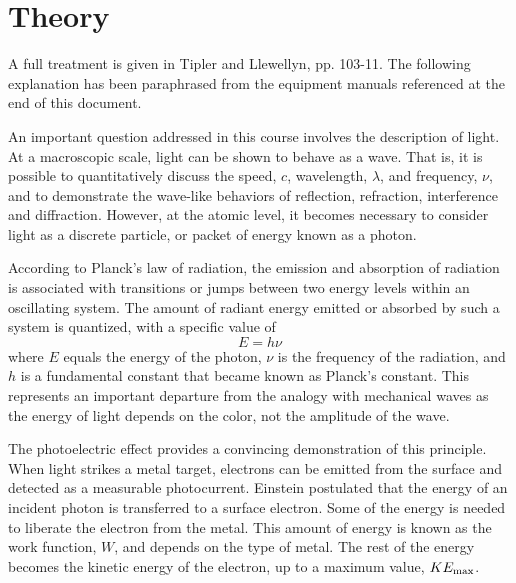 \section{Theory}


A full treatment is given in Tipler and Llewellyn, pp. 103-11.  The following explanation has been paraphrased from the equipment manuals referenced at the end of this document.

An important question addressed in this course involves the description of light.   At a macroscopic scale, light can be shown to behave as a wave.  That is, it is possible to quantitatively discuss the speed, $c$, wavelength, $\lambda$, and frequency, $\nu$, and to demonstrate the wave-like behaviors of reflection, refraction, interference and diffraction.  However, at the atomic level, it becomes necessary to consider light as a discrete particle, or packet of energy known as a photon.    

According to Planck's law of radiation, the emission and absorption of radiation is associated with transitions or jumps between two energy levels within an oscillating system.   The amount of radiant energy emitted or absorbed by such a system is quantized, with a specific value of 
\begin{equation} 
E = h \nu
\end{equation}
where $E$ equals the energy of the photon, $\nu$ is the frequency of the radiation, and $h$ is a fundamental constant that became known as Planck's constant.  This represents an important departure from the analogy with mechanical waves as the energy of light depends on the color, not the amplitude of the wave.   

The photoelectric effect provides a convincing demonstration of this principle.   When light strikes a metal target, electrons can be emitted from the surface and detected as a measurable photocurrent.    Einstein postulated that the energy of an incident photon is transferred to a surface electron.  Some of the energy is needed to liberate the electron from the metal.   This amount of energy is known as the work function, $W$, and depends on the type of metal.   The rest of the energy becomes the kinetic energy of the electron, up to a maximum value, $KE_{\rm max}$.    

